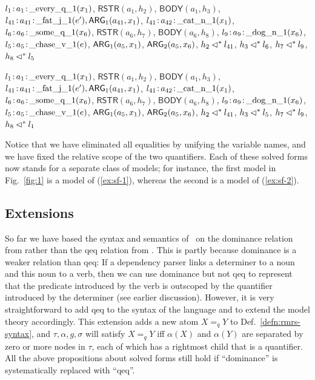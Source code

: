 \begin{examples}
\item \label{ex:sf-1}
  $l_1\colon\! a_1\colon\!\mathrm{\_every\_q\_1}(x_1)$,
  $\mathsf{RSTR}(a_1,h_2)$, $\mathsf{BODY}(a_1,h_3)$,
  $l_{41}\colon\! a_{41}\colon\!\mathrm{\_fat\_j\_1}(e'), \mathsf{ARG}_1(a_{41},x_1)$,
  $l_{41}\colon\! a_{42}\colon\!\mathrm{\_cat\_n\_1}(x_1)$,
  $l_6\colon\! a_6\colon\!\mathrm{\_some\_q\_1}(x_6)$,
  $\mathsf{RSTR}(a_6,h_7)$, $\mathsf{BODY}(a_6,h_8)$,
  $l_9\colon\! a_9\colon\!\mathrm{\_dog\_n\_1}(x_6)$,
  $l_5\colon\! a_5\colon\!\mathrm{\_chase\_v\_1}(e)$,
  $\mathsf{ARG}_1(a_5,x_1)$, $\mathsf{ARG}_2(a_5,x_6)$,
  $h_2 \lhd^* l_{41}$, $h_3 \lhd^* l_6$,
  $h_7 \lhd^* l_9$, $h_8 \lhd^* l_5$
\item \label{ex:sf-2}
  $l_1\colon\! a_1\colon\!\mathrm{\_every\_q\_1}(x_1)$,
  $\mathsf{RSTR}(a_1,h_2)$, $\mathsf{BODY}(a_1,h_3)$,
  $l_{41}\colon\! a_{41}\colon\!\mathrm{\_fat\_j\_1}(e'), \mathsf{ARG}_1(a_{41},x_1)$,
  $l_{41}\colon\! a_{42}\colon\!\mathrm{\_cat\_n\_1}(x_1)$,
  $l_6\colon\! a_6\colon\!\mathrm{\_some\_q\_1}(x_6)$,
  $\mathsf{RSTR}(a_6,h_7)$, $\mathsf{BODY}(a_6,h_8)$,
  $l_9\colon\! a_9\colon\!\mathrm{\_dog\_n\_1}(x_6)$,
  $l_5\colon\! a_5\colon\!\mathrm{\_chase\_v\_1}(e)$,
  $\mathsf{ARG}_1(a_5,x_1)$, $\mathsf{ARG}_2(a_5,x_6)$,
  $h_2 \lhd^* l_{41}$, $h_3 \lhd^* l_5$,
  $h_7 \lhd^* l_9$, $h_8 \lhd^* l_1$
\end{examples}

Notice that we have eliminated all equalities by unifying the variable
names, and we have fixed the relative scope of the two quantifiers.
Each of these solved forms now stands for a separate class of models;
for instance, the first model in Fig.~\ref{fig:1} is a model of
(\ref{ex:sf-1}), whereas the second is a model of (\ref{ex:sf-2}).



\subsection{Extensions}
\label{sec:extensions}

So far we have based the syntax and semantics of \rmrs\ on the
dominance relation from  rather than the qeq
relation from .  This is partly because
dominance is a weaker relation than qeq: If a dependency parser links
a determiner to a noun and this noun to a verb, then we can use
dominance but not qeq to represent that the predicate introduced by
the verb is outscoped by the quantifier introduced by the determiner
(see earlier discussion).  However, it is very straightforward to add
qeq to the syntax of the language and to extend the model theory
accordingly.  This extension adds a new atom $X=_q Y$ to
Def.~\ref{defn:rmrs-syntax}, and $\tau,\alpha,g,\sigma$ will satisfy
$X=_q Y$ iff $\alpha(X)$ and $\alpha(Y)$ are separated by zero or more
nodes in $\tau$, each of which has a rightmost child that is a
quantifier. All the above propositions about solved forms still hold
if ``dominance'' is systematically replaced with ``qeq''.

